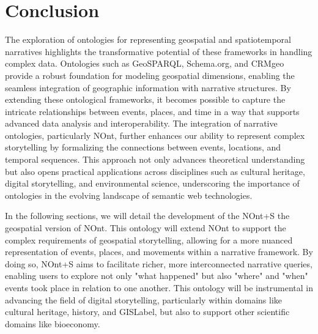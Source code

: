 \section{Conclusion}\label{III-sec:conclusion}

The exploration of ontologies for representing geospatial and spatiotemporal narratives highlights the transformative potential of these frameworks in handling complex data. Ontologies such as GeoSPARQL, Schema.org, and CRMgeo provide a robust foundation for modeling geospatial dimensions, enabling the seamless integration of geographic information with narrative structures. By extending these ontological frameworks, it becomes possible to capture the intricate relationships between events, places, and time in a way that supports advanced data analysis and interoperability. The integration of narrative ontologies, particularly NOnt, further enhances our ability to represent complex storytelling by formalizing the connections between events, locations, and temporal sequences. This approach not only advances theoretical understanding but also opens practical applications across disciplines such as cultural heritage, digital storytelling, and environmental science, underscoring the importance of ontologies in the evolving landscape of semantic web technologies.

In the following sections, we will detail the development of the NOnt+S the geospatial version of NOnt. This ontology will extend NOnt to support the complex requirements of geospatial storytelling, allowing for a more nuanced representation of events, places, and movements within a narrative framework. By doing so, NOnt+S aims to facilitate richer, more interconnected narrative queries, enabling users to explore not only "what happened" but also "where" and "when" events took place in relation to one another. This ontology will be instrumental in advancing the field of digital storytelling, particularly within domains like cultural heritage, history, and \acrshort{GISLabel}, but also to support other scientific domains like bioeconomy.

